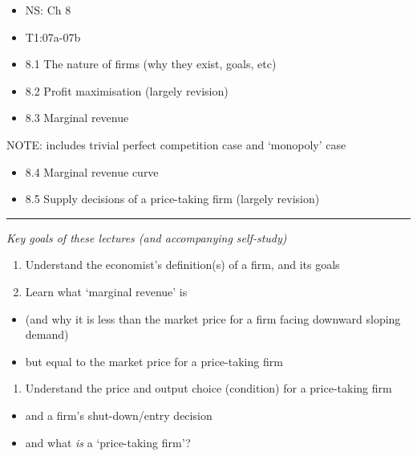 \documentclass[]{article}
\providecommand{\tightlist}{%
  \setlength{\itemsep}{0pt}\setlength{\parskip}{0pt}}
\begin{document}
\begin{itemize}
\item
  NS: Ch 8
\item
  T1:07a-07b
\item
  8.1 The nature of firms (why they exist, goals, etc)
\item
  8.2 Profit maximisation (largely revision)
\item
  8.3 Marginal revenue
\end{itemize}

NOTE: includes trivial perfect competition case and `monopoly' case

\begin{itemize}
\tightlist
\item
  8.4 Marginal revenue curve
\item
  8.5 Supply decisions of a price-taking firm (largely revision)
\end{itemize}

\begin{center}\rule{0.5\linewidth}{\linethickness}\end{center}

\emph{Key goals of these lectures (and accompanying self-study)}

\begin{enumerate}
\def\labelenumi{\arabic{enumi}.}
\tightlist
\item
  Understand the economist's definition(s) of a firm, and its goals
\item
  Learn what `marginal revenue' is
\end{enumerate}

\begin{itemize}
\tightlist
\item
  (and why it is less than the market price for a firm facing downward sloping demand)
\item
  but equal to the market price for a price-taking firm
\end{itemize}

\begin{enumerate}
\def\labelenumi{\arabic{enumi}.}
\tightlist
\item
  Understand the price and output choice (condition) for a price-taking firm
\end{enumerate}

\begin{itemize}
\tightlist
\item
  and a firm's shut-down/entry decision
\item
  and what \emph{is} a `price-taking firm'?
\end{itemize}
\end{document}
